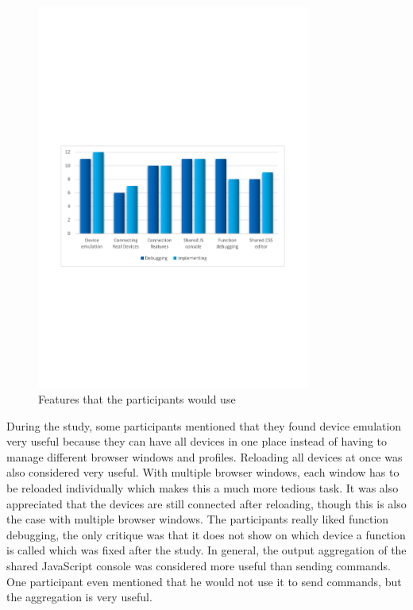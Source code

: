\begin{figure}[H]
  \centering
    \includegraphics[width=0.8\textwidth]{images/charts/would_use_features.pdf}
	\caption{Features that the participants would use}
	\label{fig:would_use_features}
\end{figure}

During the study, some participants mentioned that they found device emulation very useful because they can have all devices in one place instead of having to manage different browser windows and profiles. Reloading all devices at once was also considered very useful. With multiple browser windows, each window has to be reloaded individually which makes this a much more tedious task. It was also appreciated that the devices are still connected after reloading, though this is also the case with multiple browser windows. The participants really liked function debugging, the only critique was that it does not show on which device a function is called which was fixed after the study. In general, the output aggregation of the shared JavaScript console was considered more useful than sending commands. One participant even mentioned that he would not use it to send commands, but the aggregation is very useful. 

